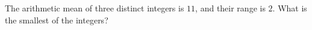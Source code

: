 The arithmetic mean of three distinct integers is $11$, and their range is $2$. What is the smallest of the integers?
